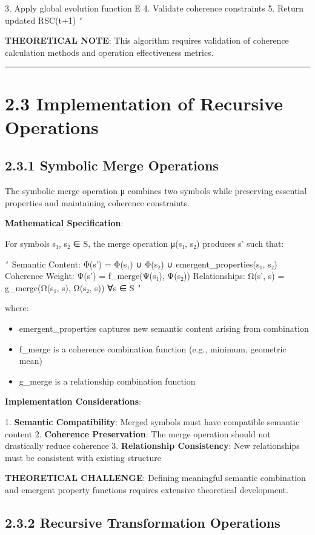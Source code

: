 3. Apply global evolution function E
4. Validate coherence constraints
5. Return updated RSC(t+1)
\texttt{`}

\textbf{THEORETICAL NOTE}: This algorithm requires validation of coherence calculation methods and operation effectiveness metrics.

\hrule

\section{2.3 Implementation of Recursive Operations}

\subsection{2.3.1 Symbolic Merge Operations}

The symbolic merge operation μ combines two symbols while preserving essential properties and maintaining coherence constraints.

\textbf{Mathematical Specification}:

For symbols s₁, s₂ ∈ S, the merge operation μ(s₁, s₂) produces s' such that:

\texttt{`}
Semantic Content: Φ(s') = Φ(s₁) ∪ Φ(s₂) ∪ emergent_properties(s₁, s₂)
Coherence Weight: Ψ(s') = f_merge(Ψ(s₁), Ψ(s₂))
Relationships: Ω(s', s) = g_merge(Ω(s₁, s), Ω(s₂, s)) ∀s ∈ S
\texttt{`}

where:
\begin{itemize}
\item emergent_properties captures new semantic content arising from combination
\item f_merge is a coherence combination function (e.g., minimum, geometric mean)
\item g_merge is a relationship combination function
\end{itemize}

\textbf{Implementation Considerations}:

1. \textbf{Semantic Compatibility}: Merged symbols must have compatible semantic content
2. \textbf{Coherence Preservation}: The merge operation should not drastically reduce coherence
3. \textbf{Relationship Consistency}: New relationships must be consistent with existing structure

\textbf{THEORETICAL CHALLENGE}: Defining meaningful semantic combination and emergent property functions requires extensive theoretical development.

\subsection{2.3.2 Recursive Transformation Operations}

